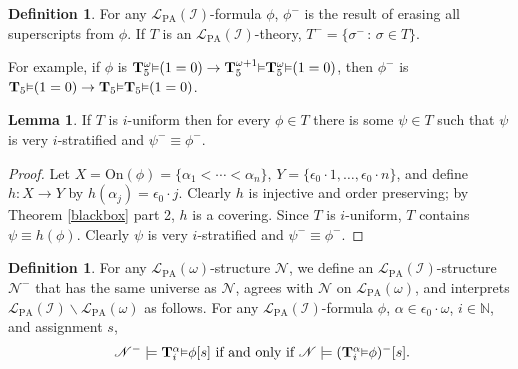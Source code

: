\documentclass[reqno]{article}
\theoremstyle{definition}
\newtheorem{lemma}[theorem]{Lemma}
\newtheorem{corollary}[theorem]{Corollary}
\newtheorem{definition}[theorem]{Definition}
\def\N{\mathbb{N}}
\def\L{\mathscr{L}}
\def\M{\mathscr{M}}
\def\T{\mathbf{T}}
\def\LPA{\L_{\mathrm{PA}}}
\def\epom{\epsilon_0\cdot\omega}
\def\indset{\mathcal I}
\def\onset{\mathrm{On}}
\renewcommand{\Pr}[1]{\T_{#1}\mbox{\small${\vDash}$}}
\newcommand{\Prr}[2]{\T^{#1}_{#2}\mbox{\small${\vDash}$}}
\begin{document}
%
%
%
%

\begin{definition}
For any $\LPA(\indset)$-formula $\phi$, $\phi^-$ is the result of erasing 
all superscripts from $\phi$.
If $T$ is an $\LPA(\indset)$-theory, $T^-=\{\sigma^-\,:\,\sigma\in 
T\}$.
\end{definition}

For example, if $\phi$ is $\Prr{\omega}{5}(1=0)\rightarrow\Prr{\omega+1}{5}\Prr{\omega}{5}(1=0)$,
then $\phi^-$ is $\Pr{5}(1=0)\rightarrow\Pr{5}\Pr{5}(1=0)$.

\begin{lemma}
\label{verystratifiableaxioms}
If $T$ is $i$-uniform then for every $\phi\in T$ there is some $\psi\in T$
such that $\psi$ is very $i$-stratified and $\psi^-\equiv\phi^-$.
\end{lemma}

\begin{proof}
Let $X=\onset(\phi)=\{\alpha_1<\cdots<\alpha_n\}$, $Y=\{\epsilon_0\cdot 1,\ldots,\epsilon_0\cdot n\}$,
and define $h:X\to Y$ by $h(\alpha_j)=\epsilon_0\cdot j$.
Clearly $h$ is injective and order preserving; by Theorem \ref{blackbox} part 2, $h$ is a covering.
Since $T$ is $i$-uniform, $T$ contains $\psi\equiv h(\phi)$.  Clearly $\psi$ is very $i$-stratified and
$\psi^-\equiv\phi^-$.
\end{proof}

\begin{definition}
For any $\LPA(\omega)$-structure $\mathscr N$,
we define an $\LPA(\indset)$-structure $\mathscr N^-$
that has the same universe as $\mathscr N$, agrees with $\mathscr N$
on $\LPA(\omega)$,
and interprets $\LPA(\indset)\backslash\LPA(\omega)$ as follows.
For any $\LPA(\indset)$-formula $\phi$, $\alpha\in\epom$, $i\in\N$, and assignment $s$,
\[
\mbox{
$\mathscr N^- \models \Prr\alpha i\phi[s]$ if and only if $\mathscr N\models (\Prr\alpha i\phi)^-[s]$.}
\]
\end{definition}
\end{document}
